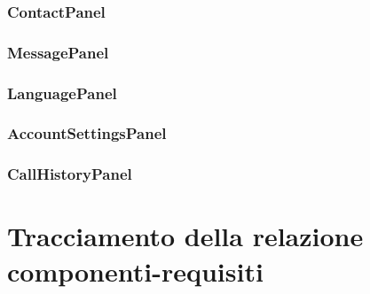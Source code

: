 \subsubsection{ContactPanel}\label{sec:contactpanel}

\subsubsection{MessagePanel}\label{sec:messagepanel}

\subsubsection{LanguagePanel}\label{sec:languagepanel}

\subsubsection{AccountSettingsPanel}\label{sec:accountsettingspanel}

\subsubsection{CallHistoryPanel}\label{sec:callhistorypanel}

\clearpage

\section{Tracciamento della relazione componenti-requisiti}


